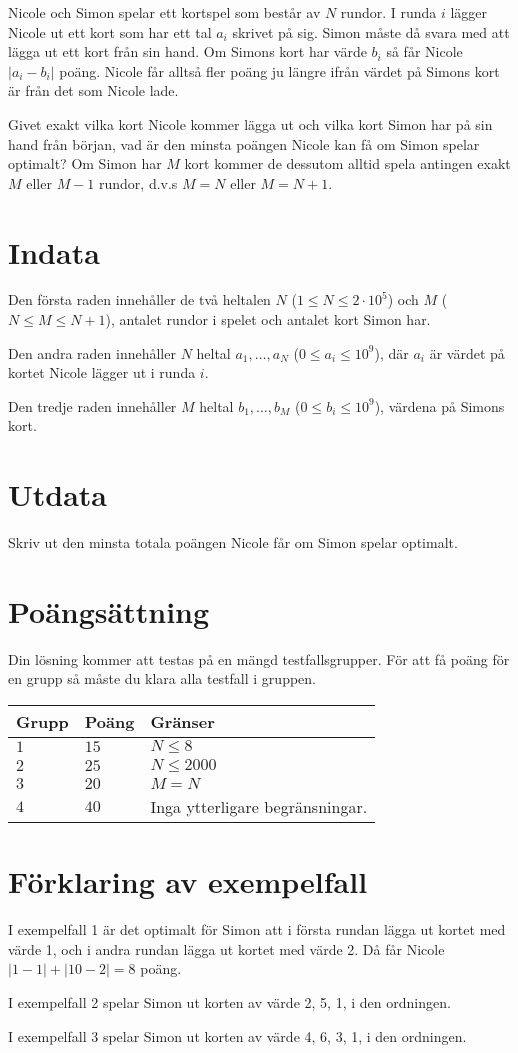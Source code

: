 Nicole och Simon spelar ett kortspel som består av $N$ rundor.
I runda $i$ lägger Nicole ut ett kort som har ett tal $a_i$ skrivet på sig.
Simon måste då svara med att lägga ut ett kort från sin hand.
Om Simons kort har värde $b_i$ så får Nicole $|a_i-b_i|$ poäng.
Nicole får alltså fler poäng ju längre ifrån värdet på Simons kort är från det som Nicole lade.

Givet exakt vilka kort Nicole kommer lägga ut och vilka kort Simon har på sin hand från början, vad är den minsta poängen Nicole kan få om Simon spelar optimalt?
Om Simon har $M$ kort kommer de dessutom alltid spela antingen exakt $M$ eller $M - 1$ rundor, d.v.s $M = N$ eller $M = N + 1$.

\section*{Indata}
Den första raden innehåller de två heltalen $N$ ($1\leq N \leq 2 \cdot 10^5$) och $M$ ($N\leq M \leq N+1$), antalet rundor i spelet och antalet kort Simon har.

Den andra raden innehåller $N$ heltal $a_1, \dots, a_N$ ($0\le a_i \le 10^9$), där $a_i$ är värdet på kortet Nicole lägger ut i runda $i$.

Den tredje raden innehåller $M$ heltal $b_1, \dots, b_M$ ($0\le b_i \le 10^9$), värdena på Simons kort.

\section*{Utdata}
Skriv ut den minsta totala poängen Nicole får om Simon spelar optimalt.

\section*{Poängsättning}
Din lösning kommer att testas på en mängd testfallsgrupper.
För att få poäng för en grupp så måste du klara alla testfall i gruppen.

\noindent
\begin{tabular}{| l | l | p{12cm} |}
  \hline
  \textbf{Grupp} & \textbf{Poäng} & \textbf{Gränser} \\ \hline
  $1$   & $15$       & $N \leq 8 $\\ \hline
  $2$   & $25$       & $N \leq 2000 $  \\ \hline
  $3$   & $20$       & $M=N$ \\ \hline
  $4$   & $40$       & Inga ytterligare begränsningar. \\ \hline
\end{tabular}

\section*{Förklaring av exempelfall}
I exempelfall 1 är det optimalt för Simon att i första rundan lägga ut kortet med värde 1, och i andra rundan lägga ut kortet med värde 2. Då får Nicole $|1-1| + |10-2|=8$ poäng.

I exempelfall 2 spelar Simon ut korten av värde 2, 5, 1, i den ordningen.

I exempelfall 3 spelar Simon ut korten av värde 4, 6, 3, 1, i den ordningen.
